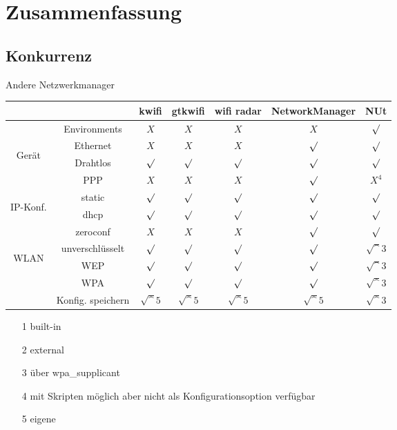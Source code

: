 
\section{Zusammenfassung}
\subsection{Konkurrenz}
\begin{frame}{Andere Netzwerkmanager}
	\fontsize{7}{8.4}\selectfont
	\begin{center}
	\begin{tabular}{cc|c|c|c|c|c}
		&					& kwifi		& gtkwifi	& wifi radar	& NetworkManager	& NUt \\
		\hline
		&Environments		& $X$			& $X$			& $X$			& $X$				& $\surd$ \\
		\hline
		\multirow{3}{*}{\begin{sideways} Gerät \end{sideways}}
		& Ethernet			& $X$			& $X$			& $X$			& $\surd$			& $\surd$ \\
		\cline{2-7}
		& Drahtlos			& $\surd$		& $\surd$		& $\surd$		& $\surd$			& $\surd$ \\
		\cline{2-7}
		& PPP				& $X$			& $X$			& $X$			& $\surd$			& $X^{4}$ \\
		\hline
		\multirow{3}{*}{\begin{sideways} IP-Konf. \end{sideways}}
		&static				& $\surd$		& $\surd$		& $\surd$		& $\surd$			& $\surd$ \\
		\cline{2-7}
		& dhcp				& $\surd$		& $\surd$		& $\surd$		& $\surd$			& $\surd$ \\
		\cline{2-7}
		& zeroconf			& $X$			& $X$			& $X$			& $\surd$			& $\surd$ \\
		\hline
		\multirow{4}{*}{\begin{sideways} WLAN \end{sideways}}
		&unverschlüsselt	& $\surd$		& $\surd$		& $\surd$		& $\surd$			& $\surd^{3}$ \\
		\cline{2-7}
		&WEP				& $\surd$		& $\surd$		& $\surd$		& $\surd$			& $\surd^{3}$ \\
		\cline{2-7}
		&WPA				& $\surd$		& $\surd$		& $\surd$		& $\surd$			& $\surd^{3}$ \\
		\cline{2-7}
		&Konfig. speichern	& $\surd^{5}$	& $\surd^{5}$	& $\surd^{5}$	& $\surd^{5}$		& $\surd^{3}$
	\end{tabular}
	\end{center}
	\begin{itemize}
		\item[1] built-in
		\item[2] external
		\item[3] über wpa\_supplicant
		\item[4] mit Skripten möglich aber nicht als Konfigurationsoption verfügbar
		\item[5] eigene
	\end{itemize}
\end{frame}

